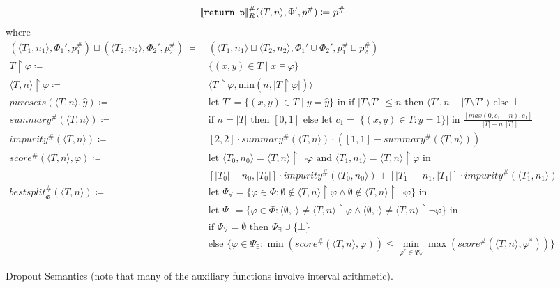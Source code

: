 \begin{figure}
\begin{align*}
%
\den[R]{\returnnode}^\#(\argtuple) \coloneqq&~ p^\#
\end{align*}
where
\begin{align*}
(\langle T_1, n_1 \rangle, \Phi_1', p_1^\#) \sqcup (\langle T_2, n_2 \rangle, \Phi_2', p_2^\#)
\coloneqq&~
(\langle T_1, n_1 \rangle \sqcup \langle T_2, n_2 \rangle,
\Phi_1' \cup \Phi_2', p_1^\# \sqcup p_2^\#) \\
%
T \upharpoonright \varphi \coloneqq&~ \{(x,y) \in T \mid x \models \varphi\} \\
%
\langle T, n \rangle \upharpoonright \varphi \coloneqq&~
\langle T \upharpoonright \varphi, \text{min}(n, |T \upharpoonright \varphi|) \rangle \\
%
\mathit{puresets}(\langle T, n\rangle, \hat{y}) \coloneqq&~
\text{let } T' = \{(x,y) \in T \mid y = \hat{y}\} \text{ in }
\text{if } |T \setminus T'| \leq n \text{ then } \langle T', n - |T \setminus T'| \rangle
\text{ else } \bot \\
%
\mathit{summary}^\#(\langle T, n \rangle) \coloneqq&~
\text{if } n = |T| \text{ then } [0, 1] \text{ else }
\text{let } c_1 = |\{(x,y) \in T : y = 1\}| \text{ in }
\frac{[max(0, c_1 - n), c_1]}{[|T| - n, |T|]}\\
%
\mathit{impurity}^\#(\langle T, n \rangle) \coloneqq&~
[2,2] \cdot \mathit{summary^\#(\langle T, n \rangle)}
\cdot ([1,1] - summary^\#(\langle T, n \rangle)) \\
%
\mathit{score}^\#(\langle T, n \rangle, \varphi) \coloneqq&~
\text{let } \langle T_0, n_0 \rangle = \langle T, n \rangle \upharpoonright \lnot \varphi
\text{ and } \langle T_1, n_1 \rangle = \langle T, n \rangle \upharpoonright \varphi \text{ in } \\
&~[|T_0| - n_0, |T_0|] \cdot \mathit{impurity}^\#(\langle T_0, n_0 \rangle) +
[|T_1| - n_1, |T_1|] \cdot \mathit{impurity}^\#(\langle T_1, n_1 \rangle)\\
%
\mathit{bestsplit}^\#_\Phi(\langle T, n \rangle) \coloneqq&~
\text{let } \Psi_\forall = \{\varphi \in \Phi : \emptyset \not \in \langle T, n \rangle \upharpoonright \varphi
\land \emptyset \not \in \langle T, n \rangle \upharpoonright \lnot\varphi\} \text{ in } \\
&~\text{let } \Psi_\exists = \{\varphi \in \Phi :
\langle \emptyset, \cdot \rangle \neq \langle T, n \rangle \upharpoonright \varphi \land
\langle \emptyset, \cdot \rangle \neq \langle T, n \rangle \upharpoonright \lnot \varphi \} \text{ in } \\
&~\text{if } \Psi_\forall = \emptyset \text{ then } \Psi_\exists \cup \{\bot\} \\
&~\text{else } \{\varphi \in \Psi_\exists : \min(\mathit{score}^\#(\langle T, n \rangle, \varphi))
\leq \min_{\varphi^* \in \Psi_\forall} \max(\mathit{score}^\#(\langle T, n \rangle, \varphi^*))\}
\end{align*}
\caption{Dropout Semantics (note that many of the auxiliary functions involve interval arithmetic).}
\label{fig:abstract}
\end{figure}


